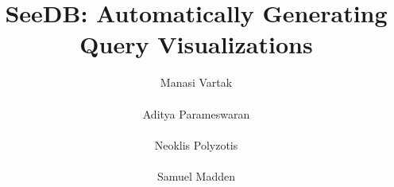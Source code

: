 \documentclass{sig-alternate}
\begin{document}
\newcommand{\agp}[1]{\textcolor{red}{Aditya: #1}}
\newcommand{\SeeDB}{{\sc SeeDB}}
\newcommand{\calQ}{\mathcal{Q}}
\newcommand{\calR}{\mathcal{R}}
\newcommand{\att}[1]{{\text{#1}}}

\newtheorem{definition}{Definition}[section]
\newtheorem{example}[definition]{Example}
\newtheorem{problem}{Problem}[section]
\renewcommand{\baselinestretch}{0.995}





\newcommand{\squishlist}{
   \begin{list}{$\bullet$}
    { \setlength{\itemsep}{0pt}
      \setlength{\parsep}{2pt}
      \setlength{\topsep}{0pt}
      \setlength{\partopsep}{0pt}
      \leftmargin=25pt
\rightmargin=0pt
\labelsep=5pt
\labelwidth=10pt
\itemindent=0pt
\listparindent=0pt
\itemsep=\parsep
    }
}
\newcommand{\squishend}{\end{list}}

\newenvironment{denselist}{
    \begin{list}{\tiny{$\bullet$}}%
    {\setlength{\itemsep}{0ex} \setlength{\topsep}{0ex}
    \setlength{\parsep}{0pt} \setlength{\itemindent}{0pt}
    \setlength{\leftmargin}{0.5em}
    \setlength{\partopsep}{0pt}}}%
    {\end{list}}

\newcommand{\eat}[1]{}
\newcommand{\papertext}[1]{#1}
\newcommand{\techreport}[1]{}

\newcommand{\techreporttext}[1]{}
\newcommand{\stitle}[1]{\vspace{0.25em}\noindent\textbf{#1}}




\title{{\LARGE \sc SeeDB}: Automatically Generating Query Visualizations}

 

\author{
\alignauthor
Manasi Vartak \\ 
 \\
\alignauthor
Aditya Parameswaran \\ 
 \\
\alignauthor Neoklis Polyzotis \\ 
 \\ 
\alignauthor Samuel Madden \\ 
 \\ 
}
\end{document}
